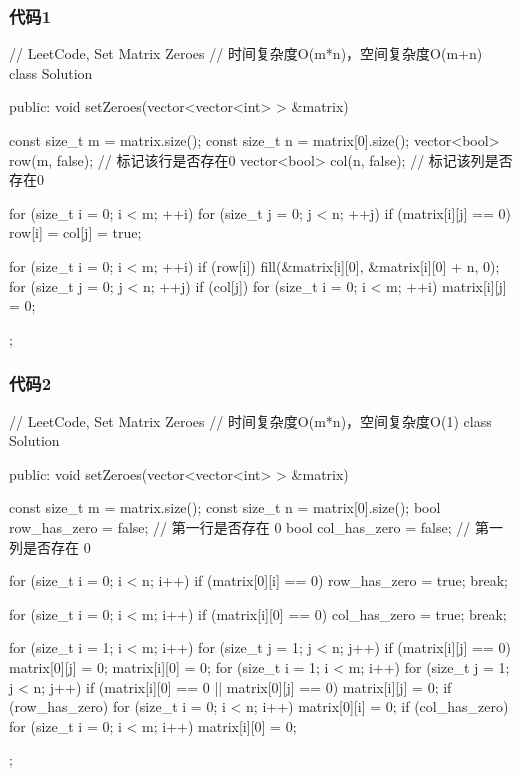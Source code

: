 \subsubsection{代码1}
\begin{Code}
// LeetCode, Set Matrix Zeroes
// 时间复杂度O(m*n)，空间复杂度O(m+n)
class Solution {
public:
    void setZeroes(vector<vector<int> > &matrix) {
        const size_t m = matrix.size();
        const size_t n = matrix[0].size();
        vector<bool> row(m, false); // 标记该行是否存在0
        vector<bool> col(n, false); // 标记该列是否存在0

        for (size_t i = 0; i < m; ++i) {
            for (size_t j = 0; j < n; ++j) {
                if (matrix[i][j] == 0) {
                    row[i] = col[j] = true;
                }
            }
        }

        for (size_t i = 0; i < m; ++i) {
            if (row[i])
                fill(&matrix[i][0], &matrix[i][0] + n, 0);
        }
        for (size_t j = 0; j < n; ++j) {
            if (col[j]) {
                for (size_t i = 0; i < m; ++i) {
                    matrix[i][j] = 0;
                }
            }
        }
    }
};
\end{Code}


\subsubsection{代码2}
\begin{Code}
// LeetCode, Set Matrix Zeroes
// 时间复杂度O(m*n)，空间复杂度O(1)
class Solution {
public:
    void setZeroes(vector<vector<int> > &matrix) {
        const size_t m = matrix.size();
        const size_t n = matrix[0].size();
        bool row_has_zero = false; // 第一行是否存在 0
        bool col_has_zero = false; // 第一列是否存在 0

        for (size_t i = 0; i < n; i++)
            if (matrix[0][i] == 0) {
                row_has_zero = true;
                break;
            }

        for (size_t i = 0; i < m; i++)
            if (matrix[i][0] == 0) {
                col_has_zero = true;
                break;
            }

        for (size_t i = 1; i < m; i++)
            for (size_t j = 1; j < n; j++)
                if (matrix[i][j] == 0) {
                    matrix[0][j] = 0;
                    matrix[i][0] = 0;
                }
        for (size_t i = 1; i < m; i++)
            for (size_t j = 1; j < n; j++)
                if (matrix[i][0] == 0 || matrix[0][j] == 0)
                    matrix[i][j] = 0;
        if (row_has_zero)
            for (size_t i = 0; i < n; i++)
                matrix[0][i] = 0;
        if (col_has_zero)
            for (size_t i = 0; i < m; i++)
                matrix[i][0] = 0;
    }
};
\end{Code}


